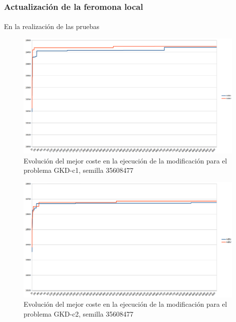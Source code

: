 	\subsubsection{Actualización de la feromona local}
	
	\paragraph{}En la realización de las pruebas 
	
	\begin{figure}[H]
		\centering
		\includegraphics[scale=0.3]{img/convergenciaGKD1mejora.png}
		\caption{Evolución del mejor coste en la ejecución de la modificación para el problema GKD-c1, semilla 35608477}
		\label{gkd-c1_convergencia_mejora}
	\end{figure}

	\begin{figure}[H]
		\centering
		\includegraphics[scale=0.3]{img/convergenciaGKD2mejora.png}
		\caption{Evolución del mejor coste en la ejecución de la modificación para el problema GKD-c2, semilla 35608477}
		\label{gkd-c2_convergencia_mejora}
	\end{figure}

